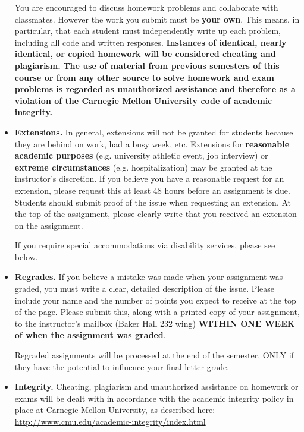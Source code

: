 \documentclass[11pt]{article}
\begin{document}
\begin{itemize}
You are encouraged to discuss homework problems and collaborate with classmates.  However the work you submit must be {\bf your own}.  This means, in
particular, that each student must independently write up each problem, including all code and written responses.  {\bf Instances of identical, nearly identical, or copied homework will be considered cheating and plagiarism.}  {\bf The use of material from previous semesters of this course or from any other source to solve homework and exam problems is regarded as unauthorized assistance and therefore as a violation of the Carnegie Mellon University code of academic integrity.}


\item {\bf Extensions.}  In general, extensions will not be granted for students because they are behind on work, had a busy week, etc.  Extensions for \textbf{reasonable academic purposes} (e.g. university athletic event, job interview) or \textbf{extreme circumstances} (e.g. hospitalization) may be granted at the instructor's discretion.  If you believe you have a reasonable request for an extension, please request this at least 48 hours before an assignment is due.  Students should submit proof of the issue when requesting an extension.  At the top of the assignment, please clearly write that you received an extension on the assignment.

If you require special accommodations via disability services, please see below.


\item {\bf Regrades.}  If you believe a mistake was made when your assignment was graded, you must write a clear, detailed description of the issue.  Please include your name and the number of points you expect to receive at the top of the page.  Please submit this, along with a printed copy of your assignment, to the instructor's mailbox (Baker Hall 232 wing) \textbf{WITHIN ONE WEEK of when the assignment was graded}.  

Regraded assignments will be processed at the end of the semester, ONLY if they have the potential to influence your final letter grade.


\item {\bf Integrity.} Cheating, plagiarism and unauthorized assistance on homework or exams will be dealt with in accordance with the academic integrity policy in place at Carnegie Mellon University, as described here:  \url{http://www.cmu.edu/academic-integrity/index.html}


\end{itemize}
\end{document}
